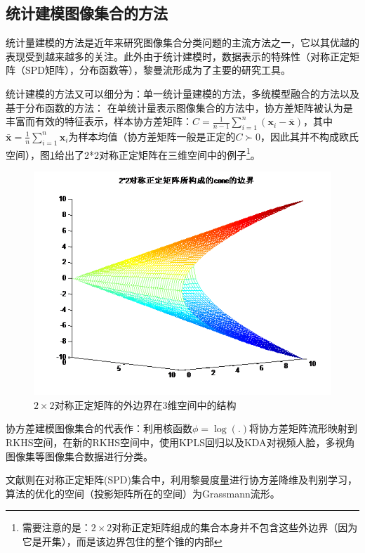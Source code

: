 \subsection{统计建模图像集合的方法}
\label{sec:current_Statistics}
统计量建模的方法是近年来研究图像集合分类问题的主流方法之一，它以其优越的表现受到越来越多的关注。此外由于统计建模时，数据表示的特殊性（对称正定矩阵（SPD矩阵），分布函数等），黎曼流形成为了主要的研究工具。

统计建模的方法又可以细分为：单一统计量建模的方法，多统模型融合的方法以及基于分布函数的方法：
在单统计量表示图像集合的方法中，协方差矩阵被认为是丰富而有效的特征表示，样本协方差矩阵：$C=\frac{1}{n-1}\sum_{i=1}^n (\bm{x}_i-\bar{\bm{x}})$，其中$\bar{\bm{x}}=\frac{1}{n}\sum_{i=1}^n \bm{x}_i$为样本均值（协方差矩阵一般是正定的$C \succ 0$，因此其并不构成欧氏空间），图\ref{fig:2d_SPD_cone}给出了2*2对称正定矩阵在三维空间中的例子\footnote{需要注意的是：$2\times 2$对称正定矩阵组成的集合本身并不包含这些外边界（因为它是开集），而是该边界包住的整个锥的内部}。
\begin{figure}[h]
	\centering
	\includegraphics[width=0.5\linewidth]{source/2d_SPD_cone.png}
	\caption{$2\times 2$对称正定矩阵的外边界在3维空间中的结构}
	\label{fig:2d_SPD_cone}
\end{figure}

协方差建模图像集合的代表作\cite{Statistics_CDL}：利用核函数$\phi=\log(.)$将协方差矩阵流形映射到RKHS空间，在新的RKHS空间中，使用KPLS\cite{Kernel_KPLS}回归以及KDA\cite{Kernel_KDA}对视频人脸，多视角图像集等图像集合数据进行分类。

文献\cite{Statistics_SPDML}则在对称正定矩阵(SPD)集合中，利用黎曼度量进行协方差降维及判别学习，算法的优化的空间（投影矩阵所在的空间）为Grassmann流形。

